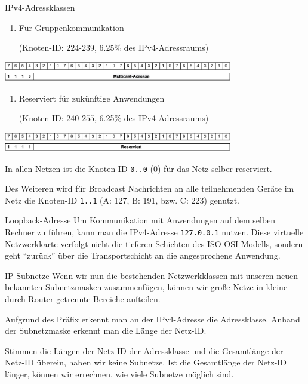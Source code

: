 \begin{defi}{IPv4-Adressklassen}
    \begin{enumerate}[label=Klasse \Alph*:, leftmargin=*, start=4]
        \item Für Gruppenkommunikation
              
              (Knoten-ID: $224\text{-}239$, 6.25\% des IPv4-Adressraums)
    \end{enumerate}
    
    \begin{center}
        \includegraphics[width=0.75\textwidth]{includes/figures/bonus_class_d.pdf}
    \end{center}
    
    \begin{enumerate}[label=Klasse \Alph*:, leftmargin=*, start=5]
        \item Reserviert für zukünftige Anwendungen
              
              (Knoten-ID: $240\text{-}255$, 6.25\% des IPv4-Adressraums)
    \end{enumerate}
    
    \begin{center}
        \includegraphics[width=0.75\textwidth]{includes/figures/bonus_class_e.pdf}
    \end{center}
    
    In allen Netzen ist die Knoten-ID \texttt{0..0} ($0$) für das Netz selber reserviert.
    
    Des Weiteren wird für Broadcast Nachrichten an alle teilnehmenden Geräte im Netz die Knoten-ID \texttt{1..1} (A: 127, B: 191, bzw. C: 223) genutzt.
\end{defi}

\begin{bonus}{Loopback-Adresse}
    Um Kommunikation mit Anwendungen auf dem selben Rechner zu führen, kann man die IPv4-Adresse \texttt{127.0.0.1} nutzen.
    Diese virtuelle Netzwerkkarte verfolgt nicht die tieferen Schichten des ISO-OSI-Modells, sondern geht \enquote{zurück} über die Transportschicht an die angesprochene Anwendung.
\end{bonus}

\begin{defi}{IP-Subnetze}
    Wenn wir nun die bestehenden Netzwerkklassen mit unseren neuen bekannten Subnetzmasken zusammenfügen, können wir große Netze in kleine durch Router getrennte Bereiche aufteilen.
    
    Aufgrund des Präfix erkennt man an der IPv4-Adresse die Adressklasse.
    Anhand der Subnetzmaske erkennt man die Länge der Netz-ID.
    
    Stimmen die Längen der Netz-ID der Adressklasse und die Gesamtlänge der Netz-ID überein, haben wir keine Subnetze.
    Ist die Gesamtlänge der Netz-ID länger, können wir errechnen, wie viele Subnetze möglich sind.
\end{defi}

